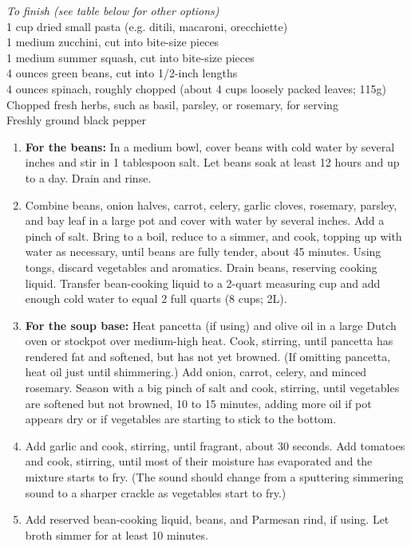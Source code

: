 \documentclass{article}
\numberwithin{figure}{section}
\numberwithin{equation}{section}
\begin{document}
{\it To finish (see table below for other options)}\\
1 cup dried small pasta (e.g. ditili, macaroni, orecchiette)\\
1 medium zucchini, cut into bite-size pieces\\
1 medium summer squash, cut into bite-size pieces \\
4 ounces green beans, cut into 1/2-inch lengths\\
4 ounces spinach, roughly chopped (about 4 cups loosely packed leaves; 115g)\\
Chopped fresh herbs, such as basil, parsley, or rosemary, for serving\\
Freshly ground black pepper\\

\begin{enumerate}
\item {\bf For the beans:} In a medium bowl, cover beans with cold water by several inches and stir in 1 tablespoon salt. Let beans soak at least 12 hours and up to a day. Drain and rinse.
\item Combine beans, onion halves, carrot, celery, garlic cloves, rosemary, parsley, and bay leaf in a large pot and cover with water by several inches. Add a pinch of salt. Bring to a boil, reduce to a simmer, and cook, topping up with water as necessary, until beans are fully tender, about 45 minutes. Using tongs, discard vegetables and aromatics. Drain beans, reserving cooking liquid. Transfer bean-cooking liquid to a 2-quart measuring cup and add enough cold water to equal 2 full quarts (8 cups; 2L).
\item {\bf For the soup base:} Heat pancetta (if using) and olive oil in a large Dutch oven or stockpot over medium-high heat. Cook, stirring, until pancetta has rendered fat and softened, but has not yet browned. (If omitting pancetta, heat oil just until shimmering.) Add onion, carrot, celery, and minced rosemary. Season with a big pinch of salt and cook, stirring, until vegetables are softened but not browned, 10 to 15 minutes, adding more oil if pot appears dry or if vegetables are starting to stick to the bottom.
\item Add garlic and cook, stirring, until fragrant, about 30 seconds. Add tomatoes and cook, stirring, until most of their moisture has evaporated and the mixture starts to fry. (The sound should change from a sputtering simmering sound to a sharper crackle as vegetables start to fry.)
\item Add reserved bean-cooking liquid, beans, and Parmesan rind, if using. Let broth simmer for at least 10 minutes.

\end{enumerate}
\end{document}

